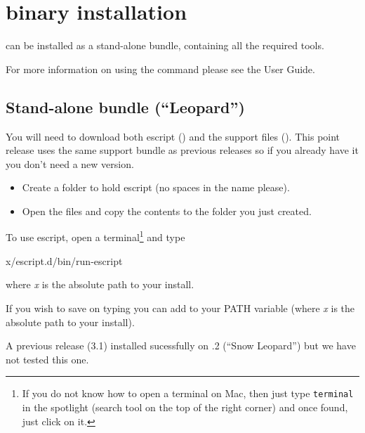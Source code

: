 %
%
%

\section{\macosx binary installation}
\label{sec:binmac}

\esfinley can be installed as a stand-alone bundle, containing all the required tools.

For more information on using the  command please see the User Guide.

\subsection{Stand-alone bundle  (``Leopard'')}

You will need to download both escript () and the support files ().
This point release uses the same support bundle as previous releases so if you already have it you don't need a new version.
\begin{itemize}
\item Create a folder to hold escript (no spaces in the name please).
\item Open the  files and copy the contents to the folder you just created.
\end{itemize}

To use escript, open a terminal\footnote{If you do not know how to open a terminal on Mac, then just type \texttt{terminal} in the spotlight (search tool on the top of the right corner) and once found, just click on it.} and type
\begin{shellCode}
x/escript.d/bin/run-escript
\end{shellCode}
where \textit{x} is the absolute path to your install.

If you wish to save on typing you can add  to your PATH variable (where \textit{x} is the absolute path to your install). 


A previous release (3.1) installed sucessfully on .2 (``Snow Leopard'') but we have not tested this one. 

